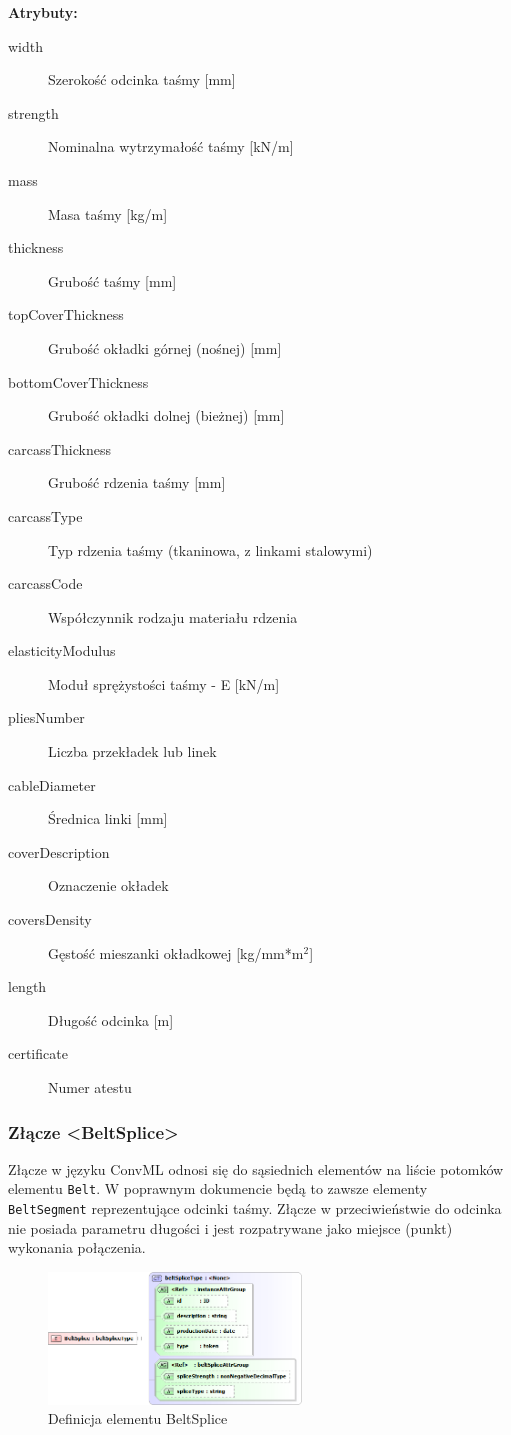 \documentclass[12pt,a4paper]{article}
\begin{document}
\noindent\textbf{Atrybuty:}
\begin{description}
\item[width] Szerokość odcinka taśmy [mm]
\item[strength] Nominalna wytrzymałość taśmy [kN/m]
\item[mass] Masa taśmy [kg/m]
\item[thickness] Grubość taśmy [mm]
\item[topCoverThickness] Grubość okładki górnej (nośnej) [mm]
\item[bottomCoverThickness] Grubość okładki dolnej (bieżnej) [mm]
\item[carcassThickness] Grubość rdzenia taśmy [mm]
\item[carcassType] Typ rdzenia taśmy (tkaninowa, z linkami stalowymi)
\item[carcassCode] Współczynnik rodzaju materiału rdzenia
\item[elasticityModulus] Moduł sprężystości taśmy - E [kN/m]
\item[pliesNumber] Liczba przekładek lub linek
\item[cableDiameter] Średnica linki [mm]
\item[coverDescription] Oznaczenie okładek
\item[coversDensity] Gęstość mieszanki okładkowej [kg/mm*m$^2$]
\item[length] Długość odcinka [m]
\item[certificate] Numer atestu
\end{description}


\subsubsection{Złącze <BeltSplice>}
Złącze w języku ConvML odnosi się do sąsiednich elementów na liście potomków
elementu {\tt Belt}.  W poprawnym dokumencie będą to zawsze elementy {\tt
  BeltSegment} reprezentujące odcinki taśmy.  Złącze w przeciwieństwie do
odcinka nie posiada parametru długości i jest rozpatrywane jako miejsce (punkt)
wykonania połączenia.

\begin{figure}[H]
  \centering
  \includegraphics[width=0.6\textwidth]{png/belt_splice_xsd2}
  \caption{Definicja elementu BeltSplice}
  \label{fig:beltSplice-xsd}
\end{figure}
\end{document}

